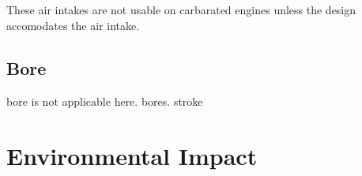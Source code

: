 \documentclass[a4paper,10pt]{report}
\begin{document}
\paragraph*{}These air intakes are not usable on carbarated engines unless the design accomodates the air intake.
\section{Bore}\Gls{bore} is not applicable here. \glspl{bore}. \Gls{stroke}

\chapter{Environmental Impact}


\printglossaries
\end{document}
